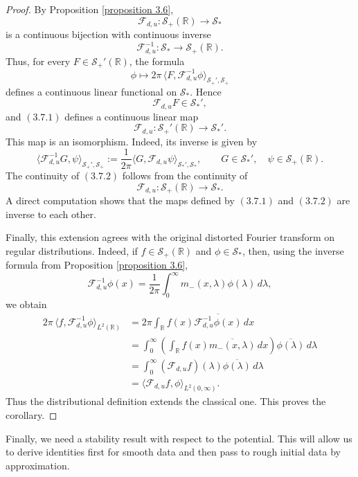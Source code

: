 \documentclass[10pt]{article}
\numberwithin{equation}{section}
\numberwithin{theorem}{section}
\begin{document}
\begin{proof}
By Proposition \ref{proposition 3.6},
\[
\mathcal F_{d,u}:\mathcal S_+(\mathbb R)\to\mathcal S_*
\]
is a continuous bijection with continuous inverse
\[
\mathcal F_{d,u}^{-1}:\mathcal S_*\to\mathcal S_+(\mathbb R).
\]
Thus, for every \(F\in\mathcal S_+'(\mathbb R)\), the formula
\[
\phi\mapsto
2\pi\,
\langle F,\mathcal F_{d,u}^{-1}\phi\rangle_{\mathcal S_+',\mathcal S_+}
\]
defines a continuous linear functional on \(\mathcal S_*\). Hence
\[
\mathcal F_{d,u}F\in\mathcal S_*',
\]
and \((3.7.1)\) defines a continuous linear map
\[
\mathcal F_{d,u}:\mathcal S_+'(\mathbb R)\to\mathcal S_*'.
\]
This map is an isomorphism. Indeed, its inverse is given by
\[
\langle \mathcal F_{d,u}^{-1}G,\psi\rangle_{\mathcal S_+',\mathcal S_+}
:=
\frac1{2\pi}
\langle G,\mathcal F_{d,u}\psi\rangle_{\mathcal S_*',\mathcal S_*},
\qquad
G\in\mathcal S_*',\quad \psi\in\mathcal S_+(\mathbb R).
\tag{3.7.2}
\]
The continuity of \((3.7.2)\) follows from the continuity of
\[
\mathcal F_{d,u}:\mathcal S_+(\mathbb R)\to\mathcal S_*.
\]
A direct computation shows that the maps defined by \((3.7.1)\) and \((3.7.2)\) are
inverse to each other.

Finally, this extension agrees with the original distorted Fourier transform on regular
distributions. Indeed, if \(f\in\mathcal S_+(\mathbb R)\) and \(\phi\in\mathcal S_*\),
then, using the inverse formula from Proposition \ref{proposition 3.6},
\[
\mathcal F_{d,u}^{-1}\phi(x)
=
\frac1{2\pi}
\int_0^\infty m_-(x,\lambda)\phi(\lambda)\,d\lambda,
\]
we obtain
\[
\begin{aligned}
2\pi\,
\langle f,\mathcal F_{d,u}^{-1}\phi\rangle_{L^2(\mathbb R)}
&=
2\pi
\int_{\mathbb R}
f(x)\overline{\mathcal F_{d,u}^{-1}\phi(x)}\,dx  \\
&=
\int_0^\infty
\left(
\int_{\mathbb R}f(x)\overline{m_-(x,\lambda)}\,dx
\right)
\overline{\phi(\lambda)}\,d\lambda  \\
&=
\int_0^\infty
(\mathcal F_{d,u}f)(\lambda)\overline{\phi(\lambda)}\,d\lambda  \\
&=
\langle \mathcal F_{d,u}f,\phi\rangle_{L^2(0,\infty)}.
\end{aligned}
\]
Thus the distributional definition extends the classical one. This proves the corollary.
\end{proof}
\noindent
Finally, we need a stability result with respect to the potential. This will allow us to
derive identities first for smooth data and then pass to rough initial data by
approximation.
\end{document}

